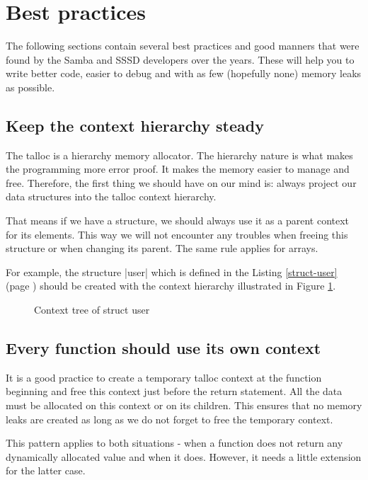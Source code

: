 \section{Best practices}
\label{talloc:sec:best-practices}

The following sections contain several best practices and good manners that were
found by the Samba and SSSD developers over the years. These will help you to
write better code, easier to debug and with as few (hopefully none) memory
leaks as possible.

\subsection{Keep the context hierarchy steady}

The talloc is a hierarchy memory allocator. The hierarchy nature is what makes
the programming more error proof. It makes the memory easier to manage and free.
Therefore, the first thing we should have on our mind is: always project our
data structures into the talloc context hierarchy.

That means if we have a structure, we should always use it as a parent context
for its elements. This way we will not encounter any troubles when freeing this
structure or when changing its parent. The same rule applies for arrays.

For example, the structure |user| which is defined in the Listing
\ref{struct-user} (page \pageref{struct-user}) should be created with the
context hierarchy illustrated in Figure \ref{fig:bp-context-tree}.

\begin{figure}[H]
  \centering
  
  \caption{Context tree of struct user}
  \label{fig:bp-context-tree}
\end{figure}

\subsection{Every function should use its own context}
\label{talloc:subsec:function-use-own-context}

It is a good practice to create a temporary talloc context at the function
beginning and free this context just before the return statement. All the data
must be allocated on this context or on its children. This ensures that no
memory leaks are created as long as we do not forget to free the temporary
context.

This pattern applies to both situations - when a function does not return any
dynamically allocated value and when it does. However, it needs a little
extension for the latter case.

